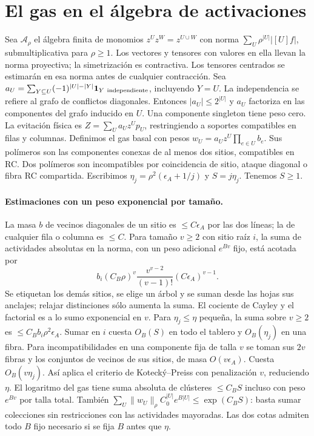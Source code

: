 \section{El gas en el álgebra de activaciones}
Sea $\mathcal A_\rho$ el álgebra finita de monomios $z^Uz^W=z^{U\cup W}$ con norma
$\sum_U\rho^{|U|}|[U]f|$, submultiplicativa para $\rho\ge1$. Los vectores y tensores
con valores en ella llevan la norma proyectiva; la simetrización es contractiva.
Los tensores centrados se estimarán en esa norma antes de cualquier contracción.
Sea $a_U=\sum_{Y\subseteq U}(-1)^{|U|-|Y|}{\bf1}_{Y\ \mathrm{independiente}}$, incluyendo
$Y=U$. La independencia se refiere al grafo de conflictos diagonales.
Entonces $|a_U|\le2^{|U|}$ y $a_U$ factoriza en las componentes del grafo inducido en $U$.
Una componente singleton tiene peso cero. La evitación física es
$Z=\sum_U a_U z^U p_U$, restringiendo a soportes compatibles en filas y columnas.
Definimos el gas basal con pesos $w_U=a_U z^U\prod_{e\in U}b_e$.
Sus polímeros son las componentes conexas de al menos dos sitios, compatibles en RC.
Dos polímeros son incompatibles por coincidencia de sitio, ataque diagonal o fibra RC compartida.
Escribimos $\eta_j=\rho^2(\epsilon_A+1/j)$ y $S=j\eta_j$. Tenemos $S\ge1$.
\paragraph{Estimaciones con un peso exponencial por tamaño.}
La masa $b$ de vecinos diagonales de un sitio es $\le C\epsilon_A$ por las dos líneas;
la de cualquier fila o columna es $\le C$. Para tamaño $v\ge2$ con sitio raíz $i$,
la suma de actividades absolutas en la norma, con un peso adicional $e^{Bv}$ fijo, está acotada por
\[
 b_i(C_B\rho)^v\frac{v^{v-2}}{(v-1)!}(C\epsilon_A)^{v-1}.
\]
Se etiquetan los demás sitios,
se elige un árbol y se suman desde las hojas sus anclajes; relajar distinciones sólo aumenta
la suma. El cociente de Cayley y el factorial es a lo sumo exponencial en $v$.
Para $\eta_j\le\eta$ pequeña, la suma sobre $v\ge2$ es $\le C_B b_i\rho^2\epsilon_A$.
Sumar en $i$ cuesta $O_B(S)$ en todo el tablero y $O_B(\eta_j)$ en una fibra.
Para incompatibilidades en una componente fija de talla $v$ se toman sus $2v$ fibras y
los conjuntos de vecinos de sus sitios, de masa $O(v\epsilon_A)$. Cuesta $O_B(v\eta_j)$.
Así aplica el criterio de Kotecký--Preiss con penalización $v$, reduciendo $\eta$.
El logaritmo del gas tiene suma absoluta de clústeres $\le C_B S$ incluso con peso $e^{Bv}$
por talla total. También $\sum_U\|w_U\|_\rho C_0^{|U|}e^{B|U|}\le\exp(C_BS)$:
basta sumar colecciones sin restricciones con las actividades mayoradas.
Las dos cotas admiten todo $B$ fijo necesario si se fija $B$ antes que $\eta$.
